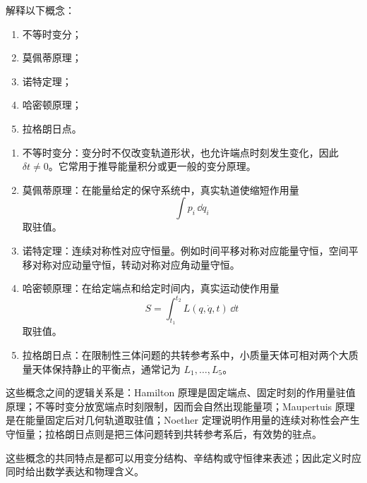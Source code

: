
\begin{question}[概念解释]
解释以下概念：
\begin{enumerate}
  \item 不等时变分；
  \item 莫佩蒂原理；
  \item 诺特定理；
  \item 哈密顿原理；
  \item 拉格朗日点。
\end{enumerate}

\begin{solution}
\begin{enumerate}
  \item 不等时变分：变分时不仅改变轨道形状，也允许端点时刻发生变化，因此 $\delta t\ne0$。它常用于推导能量积分或更一般的变分原理。
  \item 莫佩蒂原理：在能量给定的保守系统中，真实轨道使缩短作用量
  \[
    \int p_i\,\dd q_i
  \]
  取驻值。
  \item 诺特定理：连续对称性对应守恒量。例如时间平移对称对应能量守恒，空间平移对称对应动量守恒，转动对称对应角动量守恒。
  \item 哈密顿原理：在给定端点和给定时间内，真实运动使作用量
  \[
    S=\int_{t_1}^{t_2}L(q,\dot q,t)\,\dd t
  \]
  取驻值。
  \item 拉格朗日点：在限制性三体问题的共转参考系中，小质量天体可相对两个大质量天体保持静止的平衡点，通常记为 $L_1,\dots,L_5$。
\end{enumerate}


\medskip
这些概念之间的逻辑关系是：Hamilton 原理是固定端点、固定时刻的作用量驻值原理；不等时变分放宽端点时刻限制，因而会自然出现能量项；Maupertuis 原理是在能量固定后对几何轨道取驻值；Noether 定理说明作用量的连续对称性会产生守恒量；拉格朗日点则是把三体问题转到共转参考系后，有效势的驻点。


\medskip
这些概念的共同特点是都可以用变分结构、辛结构或守恒律来表述；因此定义时应同时给出数学表达和物理含义。
\end{solution}
\end{question}

